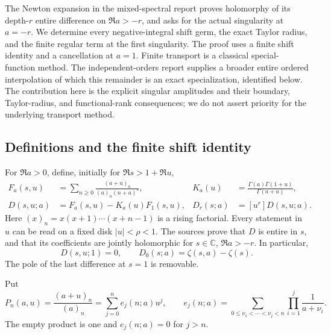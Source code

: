 \documentclass[11pt,a4paper]{article}
\numberwithin{equation}{section}
\theoremstyle{definition}
\theoremstyle{remark}
\begin{document}
The Newton expansion in the mixed-spectral report \cite{RepoMixed}
proves holomorphy of its depth-$r$ entire difference on $\Re a>-r$,
and asks for the actual singularity at $a=-r$.  We determine every
negative-integral shift germ, the exact Taylor radius, and the finite
regular term at the first singularity.  The proof uses a finite shift
identity and a cancellation at $a=1$.  Finite transport is a classical
special-function method.  The independent-orders report
\cite{RepoIndependent} supplies a broader entire ordered interpolation
of which this remainder is an exact specialization, identified below.
The contribution here is the explicit singular amplitudes and their
boundary, Taylor-radius, and functional-rank consequences; we do not
assert priority for the underlying transport method.

\subsection{Definitions and the finite shift identity}

For $\Re a>0$, define, initially for $\Re s>1+\Re u$,
\begin{align}
 F_a(s,u)&=\sum_{n\geq0}\frac{(a+u)_n}{(a)_n(n+a)^s},
 &K_a(u)&=\frac{\Gamma(a)\Gamma(1+u)}{\Gamma(a+u)},\label{hsh:definitions}\\
 D(s,u;a)&=F_a(s,u)-K_a(u)F_1(s,u),
 &D_r(s;a)&=[u^r]D(s,u;a).\label{hsh:difference}
\end{align}
Here $(x)_n=x(x+1)\cdots(x+n-1)$ is a rising factorial.  Every
statement in $u$ can be read on a fixed disk $|u|<\rho<1$.
The sources \cite{RepoExact,RepoMixed} prove that $D$ is entire in
$s$, and that its coefficients are jointly holomorphic for
$s\in\mathbb C$, $\Re a>-r$.  In particular,
\begin{equation}\label{hsh:basezero}
 D(s,u;1)=0,\qquad D_0(s;a)=\zeta(s,a)-\zeta(s).
\end{equation}
The pole of the last difference at $s=1$ is removable.

Put
\begin{equation}\label{hsh:P}
 P_n(a,u)=\frac{(a+u)_n}{(a)_n}
       =\sum_{j=0}^n e_j(n;a)u^j,
 \qquad
 e_j(n;a)=\sum_{0\leq\nu_1<\cdots<\nu_j<n}
                  \prod_{i=1}^j\frac1{a+\nu_i}.
\end{equation}
The empty product is one and $e_j(n;a)=0$ for $j>n$.
\end{document}
